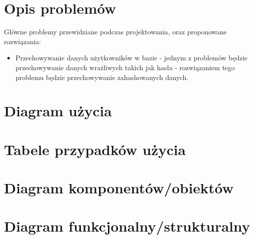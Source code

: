 \documentclass[a4paper,11pt]{uzreport}
\begin{document}
\section{Opis problemów}
	Główne problemy przewidziane podczas projektowania, oraz proponowane rozwiązania:

	\begin{itemize}[leftmargin=0.5in]
            
		\item Przechowywanie danych użytkowników w bazie - jednym z problemów będzie przechowywanie danych wrażliwych takich jak hasła - 			 			rozwiązaniem tego problemu będzie przechowywanie zahashowanych danych.
                
 	\end{itemize}

\section{Diagram użycia}
\section{Tabele przypadków użycia}



\section{Diagram komponentów/obiektów}



\section{Diagram funkcjonalny/strukturalny}


    
\clearpage
\end{document}
